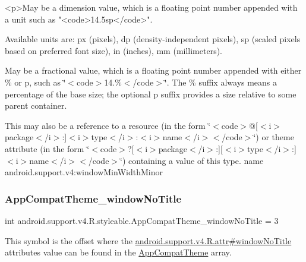 \begin{DoxyVerb}      <p>May be a dimension value, which is a floating point number appended with a unit such as "<code>14.5sp</code>".
\end{DoxyVerb}
 Available units are\+: px (pixels), dp (density-\/independent pixels), sp (scaled pixels based on preferred font size), in (inches), mm (millimeters). 

May be a fractional value, which is a floating point number appended with either \% or p, such as \char`\"{}$<$code$>$14.\%$<$/code$>$\char`\"{}. The \% suffix always means a percentage of the base size; the optional p suffix provides a size relative to some parent container. 

This may also be a reference to a resource (in the form \char`\"{}$<$code$>$@\mbox{[}$<$i$>$package$<$/i$>$\+:\mbox{]}$<$i$>$type$<$/i$>$\+:$<$i$>$name$<$/i$>$$<$/code$>$\char`\"{}) or theme attribute (in the form \char`\"{}$<$code$>$?\mbox{[}$<$i$>$package$<$/i$>$\+:\mbox{]}\mbox{[}$<$i$>$type$<$/i$>$\+:\mbox{]}$<$i$>$name$<$/i$>$$<$/code$>$\char`\"{}) containing a value of this type.  name android.\+support.\+v4\+:window\+Min\+Width\+Minor \mbox{\label{classandroid_1_1support_1_1v4_1_1R_1_1styleable_a2434c4c955064f1b931a1059e587e1bb}} 
\subsubsection{\texorpdfstring{App\+Compat\+Theme\+\_\+window\+No\+Title}{AppCompatTheme\_windowNoTitle}}
{\footnotesize\ttfamily int android.\+support.\+v4.\+R.\+styleable.\+App\+Compat\+Theme\+\_\+window\+No\+Title = 3\hspace{0.3cm}{\ttfamily [static]}}

This symbol is the offset where the \hyperlink{classandroid_1_1support_1_1v4_1_1R_1_1attr_a1f9a8ba450a55992fbdcd19844780477}{android.\+support.\+v4.\+R.\+attr\#window\+No\+Title} attribute\textquotesingle{}s value can be found in the \hyperlink{classandroid_1_1support_1_1v4_1_1R_1_1styleable_ac07ebbe62ed977f6dcaadc6397840ace}{App\+Compat\+Theme} array.

